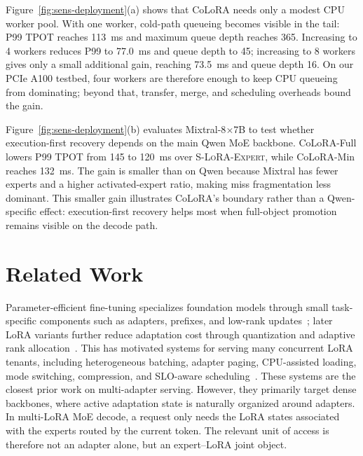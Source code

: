 \documentclass[sigplan,anonymous,review,10pt]{acmart}
\begin{document}
Figure~\ref{fig:sens-deployment}(a) shows that CoLoRA needs only a modest CPU worker pool. With one worker, cold-path queueing becomes visible in the tail: P99 TPOT reaches 113~ms and maximum queue depth reaches 365. Increasing to 4 workers reduces P99 to 77.0~ms and queue depth to 45; increasing to 8 workers gives only a small additional gain, reaching 73.5~ms and queue depth 16. On our PCIe A100 testbed, four workers are therefore enough to keep CPU queueing from dominating; beyond that, transfer, merge, and scheduling overheads bound the gain.

Figure~\ref{fig:sens-deployment}(b) evaluates Mixtral-8$\times$7B to test whether execution-first recovery depends on the main Qwen MoE backbone. CoLoRA-Full lowers P99 TPOT from 145 to 120~ms over \textsc{S-LoRA-Expert}, while CoLoRA-Min reaches 132~ms. The gain is smaller than on Qwen because Mixtral has fewer experts and a higher activated-expert ratio, making miss fragmentation less dominant. This smaller gain illustrates CoLoRA's boundary rather than a Qwen-specific effect: execution-first recovery helps most when full-object promotion remains visible on the decode path.


\section{Related Work}
\label{sec:related}

Parameter-efficient fine-tuning specializes foundation models through small task-specific components such as adapters, prefixes, and low-rank updates~\cite{houlsby2019parameter,li2021prefix,hu2022lora}; later LoRA variants further reduce adaptation cost through quantization and adaptive rank allocation~\cite{dettmers2023qlora,zhang2023adaptive}. This has motivated systems for serving many concurrent LoRA tenants, including heterogeneous batching, adapter paging, CPU-assisted loading, mode switching, compression, and SLO-aware scheduling~\cite{chen2024punica,sheng2024slora,wu2024dlora,li2025toppings,bruel2024compress}. These systems are the closest prior work on multi-adapter serving. However, they primarily target dense backbones, where active adaptation state is naturally organized around adapters. In multi-LoRA MoE decode, a request only needs the LoRA states associated with the experts routed by the current token. The relevant unit of access is therefore not an adapter alone, but an expert--LoRA joint object.
\end{document}
